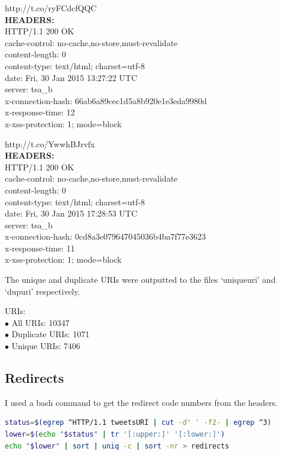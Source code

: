 \documentclass[12pt]{report}
\begin{document}
http://t.co/ryFCdcfQQC\\
\textbf{HEADERS:}\\
HTTP/1.1 200 OK\\
cache-control: no-cache,no-store,must-revalidate\\
content-length: 0\\
content-type: text/html; charset=utf-8\\
date: Fri, 30 Jan 2015 13:27:22 UTC\\
server: tsa\_b\\
x-connection-hash: 66ab6a89cec1d5a8b920e1e3eda9980d\\
x-response-time: 12\\
x-xss-protection: 1; mode=block

http://t.co/YwwhBJrvfx\\
\textbf{HEADERS:}\\
HTTP/1.1 200 OK\\
cache-control: no-cache,no-store,must-revalidate\\
content-length: 0\\
content-type: text/html; charset=utf-8\\
date: Fri, 30 Jan 2015 17:28:53 UTC\\
server: tsa\_b\\
x-connection-hash: 0cd8a3e079647045036b4ba7f77e3623\\
x-response-time: 11\\
x-xss-protection: 1; mode=block

The unique and duplicate URIs were outputted to the files `uniqueuri' and `dupuri' respectively.

URIs:\\
$\bullet$  All URIs: 10347\\
$\bullet$  Duplicate URIs: 1071\\
$\bullet$  Unique URIs: 7406

\subsection*{Redirects}

I used a bash command to get the redirect code numbers from the headers.

\begin{lstlisting}[language=bash,caption={bash code}]
status=$(egrep ^HTTP/1.1 tweetsURI | cut -d' ' -f2- | egrep ^3)
lower=$(echo "$status" | tr '[:upper:]' '[:lower:]')
echo "$lower" | sort | uniq -c | sort -nr > redirects
\end{lstlisting}
\end{document}
